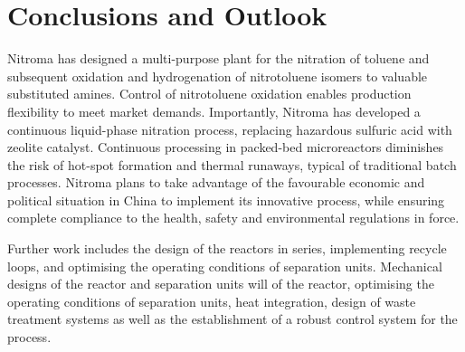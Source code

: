 \section{Conclusions and Outlook}
\label{sec:conclu}
Nitroma has designed a multi-purpose plant for the nitration of toluene and subsequent oxidation and hydrogenation of nitrotoluene isomers to valuable substituted amines.
Control of nitrotoluene oxidation enables production flexibility to meet market demands.
Importantly, Nitroma has developed a continuous liquid-phase nitration process, replacing hazardous sulfuric acid with zeolite catalyst.
Continuous processing in packed-bed microreactors diminishes the risk of hot-spot formation and thermal runaways, typical of traditional batch processes.
Nitroma plans to take advantage of the favourable economic and political situation in China to implement its innovative process, while ensuring complete compliance to the health, safety and environmental regulations in force.

Further work includes the design of the reactors in series, implementing recycle loops, and optimising the operating conditions of separation units. Mechanical designs of the reactor and separation units will of the reactor, optimising the operating conditions of separation units, heat integration, design of waste treatment systems as well as the establishment of a robust control system for the process.
